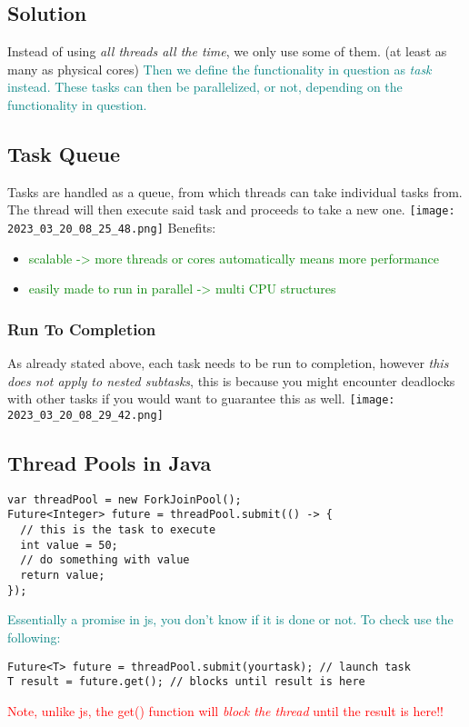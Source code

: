 \documentclass[main.tex,fontsize=8pt,paper=a4,paper=portrait,DIV=calc,]{scrartcl}
\begin{document}
\subsection{Solution}
Instead of using \emph{all threads all the time}, we only use some of them. (at least as many as physical cores)\newline
\textcolor{teal}{Then we define the functionality in question as \emph{task} instead.\newline
These tasks can then be parallelized, or not, depending on the functionality in question.}

\subsection{Task Queue}
Tasks are handled as a queue, from which threads can take individual tasks from.\newline
The thread will then execute said task and proceeds to take a new one.\newline
\texttt{[image: 2023\_03\_20\_08\_25\_48.png]}\newline
Benefits:
\begin{itemize}
\item \textcolor{green}{scalable -> more threads or cores automatically means more performance}
\item \textcolor{green}{easily made to run in parallel -> multi CPU structures}
\end{itemize} 

\subsubsection{Run To Completion}
As already stated above, each task needs to be run to completion, however \emph{this does not apply to nested subtasks}, \newline
this is because you might encounter deadlocks with other tasks if you would want to guarantee this as well.\newline
\texttt{[image: 2023\_03\_20\_08\_29\_42.png]}

\subsection{Thread Pools in Java}
\begin{lstlisting}
var threadPool = new ForkJoinPool();
Future<Integer> future = threadPool.submit(() -> {
  // this is the task to execute
  int value = 50;
  // do something with value
  return value;
});
\end{lstlisting}
\textcolor{teal}{Essentially a promise in js, you don't know if it is done or not.\newline
To check use the following:}
\begin{lstlisting}
Future<T> future = threadPool.submit(yourtask); // launch task
T result = future.get(); // blocks until result is here
\end{lstlisting}
\textcolor{red}{Note, unlike js, the get() function will \emph{block the thread} until the result is here!!}
\end{document}
